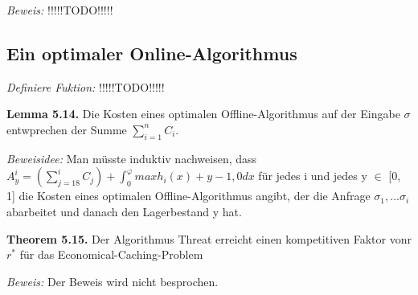 \textit{Beweis:} !!!!!TODO!!!!!

\subsection{Ein optimaler Online-Algorithmus}

\textit{Definiere Fuktion:} !!!!!TODO!!!!!

\textbf{Lemma 5.14.} Die Kosten eines optimalen Offline-Algorithmus auf der Eingabe $\sigma$ entwprechen der Summe $\sum_{i=1}^{n} C_{i}$.

\textit{Beweisidee:} Man müsste induktiv nachweisen, dass $A_{y}^{i} = (\sum_{j=18}^{i} C_{j} ) + \int_{0}^{\varphi} max{h_{i}(x) + y - 1, 0} dx $ für jedes i und jedes y $\in$ [0, 1] die Kosten eines optimalen Offline-Algorithmus angibt, der die Anfrage $\sigma_{1}, ... \sigma_{i}$ abarbeitet und danach den Lagerbestand y hat.

\textbf{Theorem 5.15.} Der Algorithmus Threat erreicht einen kompetitiven Faktor vonr $r^{*}$ für das Economical-Caching-Problem

\textit{Beweis:} Der Beweis wird nicht besprochen.

